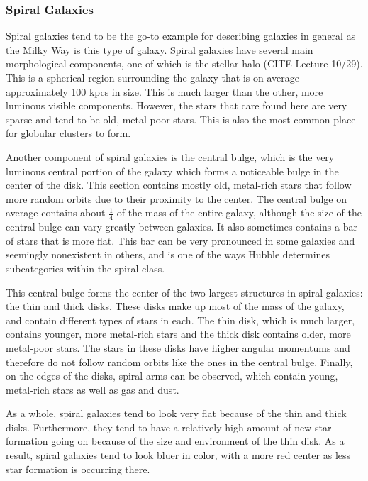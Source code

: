 \documentclass[12pt]{article}
\begin{document}
    \subsubsection{Spiral Galaxies}
    Spiral galaxies tend to be the go-to example for describing galaxies in general
    as the Milky Way is this type of galaxy.  Spiral galaxies have several main
    morphological components, one of which is the stellar halo (CITE Lecture 10/29).
    This is a spherical region surrounding the galaxy that is on average
    approximately 100 kpcs in size.  This is much larger than the other, more
    luminous visible components.  However, the stars that care found here are very
    sparse and tend to be old, metal-poor stars.  This is also the most common place
    for globular clusters to form.

    Another component of spiral galaxies is the central bulge, which is the very
    luminous central portion of the galaxy which forms a noticeable bulge in the
    center of the disk.  This section contains mostly old, metal-rich stars that
    follow more random orbits due to their proximity to the center.  The central
    bulge on average contains about $\frac{1}{4}$ of the mass of the entire
    galaxy, although the size of the central bulge can vary greatly between
    galaxies.  It also sometimes contains a bar of stars that is more flat.
    This bar can be very pronounced in some galaxies and seemingly nonexistent
    in others, and is one of the ways Hubble determines subcategories within the
    spiral class.

    This central bulge forms the center of the two largest structures in spiral
    galaxies: the thin and thick disks.  These disks make up most of the mass of
    the galaxy, and contain different types of stars in each.  The thin disk,
    which is much larger, contains younger, more metal-rich stars and the thick
    disk contains older, more metal-poor stars.  The stars in these disks have
    higher angular momentums and therefore do not follow random orbits like the
    ones in the central bulge.  Finally, on the edges of the disks, spiral arms
    can be observed, which contain young, metal-rich stars as well as gas and
    dust.

    As a whole, spiral galaxies tend to look very flat because of the thin and
    thick disks.  Furthermore, they tend to have a relatively high amount of new
    star formation going on because of the size and environment of the thin
    disk.  As a result, spiral galaxies tend to look bluer in color, with a more
    red center as less star formation is occurring there.
\end{document}
